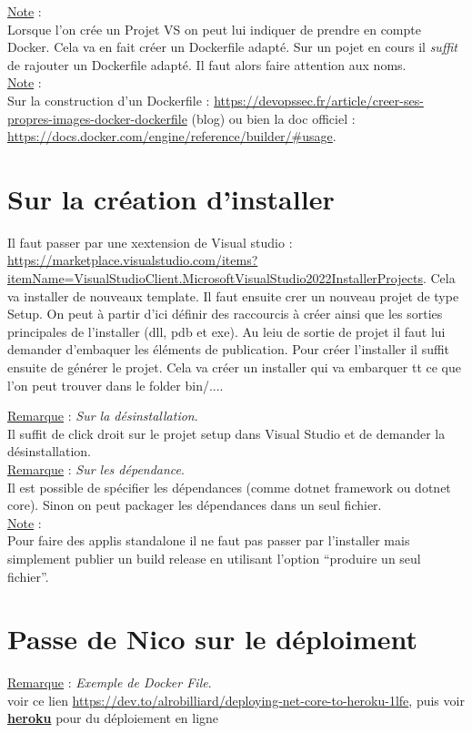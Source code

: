 \documentclass[a4paper,12pt,twoside]{article}
\newcommand{\urlcolor}{magenta}  %
\newcommand{\keycolor}{purple} %
\newcommand{\incode}[1]{{\footnotesize\ttfamily #1}} %
\newcommand{\rem}[2]{\noindent\underline{Remarque} : \textit{#1}.\\ \indent #2}
\newcommand{\note}[1]{\noindent\underline{Note} : \\ \indent #1}
\newcommand{\keyref}[2]{\hypersetup{urlcolor=\keycolor} \href{#1}{\textbf{#2}}\hypersetup{urlcolor=\urlcolor}}
\begin{document}
\note{Lorsque l'on crée un Projet VS on peut lui indiquer de prendre en compte Docker. Cela va en fait créer un Dockerfile adapté. Sur un pojet en cours il \textit{suffit} de rajouter un Dockerfile adapté. Il faut alors faire attention aux noms.}\\

\note{Sur la construction d'un Dockerfile : \url{https://devopssec.fr/article/creer-ses-propres-images-docker-dockerfile} (blog) ou bien la doc officiel : \url{https://docs.docker.com/engine/reference/builder/\#usage}.}\\

\section{Sur la création d'installer}

Il faut passer par une xextension de Visual studio : \url{https://marketplace.visualstudio.com/items?itemName=VisualStudioClient.MicrosoftVisualStudio2022InstallerProjects}. Cela va installer de nouveaux template. Il faut ensuite crer un nouveau projet de type Setup. On peut à partir d'ici définir des raccourcis à créer ainsi que les sorties principales de l'installer (dll, pdb et exe). Au leiu de sortie de projet il faut lui demander d'embaquer les éléments de publication. Pour créer l'installer il suffit ensuite de générer le projet.
Cela va créer un installer qui va embarquer tt ce que l'on peut trouver dans le folder \incode{bin/...}.

\rem{Sur la désinstallation}{Il suffit de click droit sur le projet setup dans Visual Studio et de demander la désinstallation.}\\

\rem{Sur les dépendance}{Il est possible de spécifier les dépendances (comme dotnet framework ou dotnet core). Sinon on peut packager les dépendances dans un seul fichier.}\\

\note{Pour faire des applis standalone il ne faut pas passer par l'installer mais simplement publier un build release en utilisant l'option ``produire un seul fichier''.}\\

\section{Passe de Nico sur le déploiment}

\rem{Exemple de Docker File}{voir ce lien \url{https://dev.to/alrobilliard/deploying-net-core-to-heroku-1lfe}, puis voir \keyref{https://id.heroku.com/login}{heroku} pour du déploiement en ligne}\\
\end{document}
